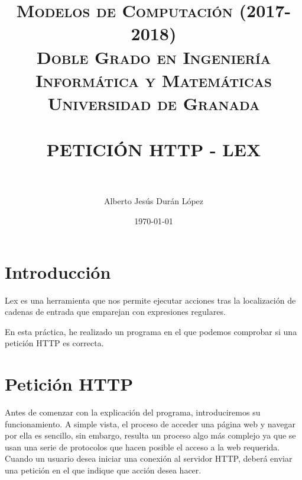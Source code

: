 

\title{	
	\normalfont \normalsize 
	\textsc{\textbf{Modelos de Computación (2017-2018)} \\ Doble Grado en Ingeniería Informática y Matemáticas \\ Universidad de Granada} \\ [25pt] 
	\horrule{0.5pt} \\[0.4cm]
	\huge PETICIÓN HTTP - LEX \\ 
	\horrule{2pt} \\[0.5cm] 
}

\author{ Alberto Jesús Durán López} 
\date{\normalsize\today}



	\maketitle       %
	\newpage 
	\tableofcontents %
	\newpage
	
	
	
	
	\section{Introducción}
	
	Lex es una herramienta que nos permite ejecutar acciones tras la localización de cadenas de entrada que emparejan con expresiones regulares.
	
	En esta práctica, he realizado un programa en el que podemos comprobar si una petición HTTP es correcta. 	
	
	
	\section{Petición HTTP}
	
	Antes de comenzar con la explicación del programa, introduciremos su funcionamiento.
	A simple vista, el proceso de acceder una página web y navegar por ella es sencillo, sin embargo, resulta un proceso algo más complejo ya que se usan una serie de protocolos que hacen posible el acceso a la web requerida. 
	Cuando un usuario desea iniciar una conexión  al servidor HTTP, deberá enviar una petición en el que indique que acción desea hacer. 
	
